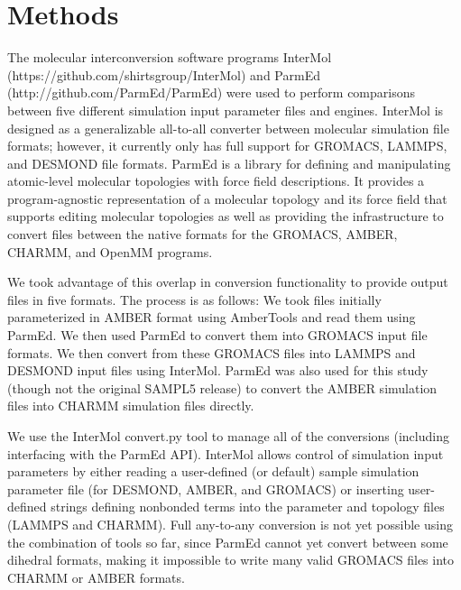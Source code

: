
\section*{Methods}
\begin{sloppypar}
The molecular interconversion software programs InterMol
(https://github.com/shirtsgroup/InterMol) and ParmEd
(http://github.com/ParmEd/ParmEd) were used to perform comparisons
between five different simulation input parameter files and engines.
InterMol is designed as a generalizable all-to-all converter between
molecular simulation file formats; however, it currently only has full
support for GROMACS, LAMMPS, and DESMOND file formats.  ParmEd is
a library for defining and manipulating atomic-level molecular topologies with
force field descriptions. It provides a program-agnostic representation of a
molecular topology and its force field that supports editing molecular
topologies as well as providing the infrastructure to convert files between the
native formats for the GROMACS, AMBER, CHARMM, and OpenMM programs.
\end{sloppypar}

We took advantage of this overlap in conversion functionality to
provide output files in five formats. The process is as follows: We
took files initially parameterized in AMBER format using AmberTools
and read them using ParmEd. We then used ParmEd to convert them into
GROMACS input file formats. We then convert from these GROMACS files
into LAMMPS and DESMOND input files using InterMol.  ParmEd was also
used for this study (though not the original SAMPL5 release) to
convert the AMBER simulation files into CHARMM simulation files
directly.

We use the InterMol convert.py tool to manage all of the conversions
(including interfacing with the ParmEd API). InterMol allows control
of simulation input parameters by either reading a user-defined (or
default) sample simulation parameter file (for DESMOND, AMBER, and
GROMACS) or inserting user-defined strings defining nonbonded terms
into the parameter and topology files (LAMMPS and CHARMM). Full
any-to-any conversion is not yet possible using the combination of
tools so far, since ParmEd cannot yet convert between some dihedral
formats, making it impossible to write many valid GROMACS files into
CHARMM or AMBER formats.

